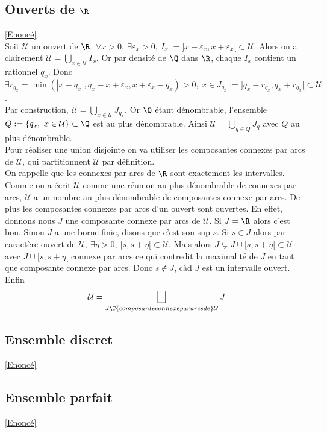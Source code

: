 \documentclass[8pt]{book}
\begin{document}
	\subsection{Ouverts de $\R$ }
	\label{Ouverts de R corrigé}
	\textcolor{blue}{\hyperref[Ouverts de R]{[Enoncé]}}\\
	Soit $\mathcal U$ un ouvert de $\R$. $\forall x>0,\ \exists \varepsilon_x>0,\ I_x:=]x-\varepsilon_x,x+\varepsilon_x[\subset\mathcal U$. Alors on a clairement $\mathcal U=\displaystyle\bigcup_{x\in \mathcal U}I_x$. Or par densité de $\Q$ dans $\R$, chaque $I_x$ contient un rationnel $q_x$. Donc $\exists r_{q_x}=\min(|x-q_x|,q_x-x+\varepsilon_x,x+\varepsilon_x-q_x)>0,\ x\in J_{q_x}:=]q_x-r_{q_x},q_x+r_{q_x}[\subset \mathcal U$.\\
	Par construction, $\mathcal U=\displaystyle\bigcup_{x\in \mathcal U}J_{q_x}$. Or $\Q$ étant dénombrable, l'ensemble $Q:=\{q_x,\ x\in \mathcal U\}\subset\Q$ est au plus dénombrable. Ainsi $\mathcal U=\displaystyle\bigcup_{q\in Q} J_q$ avec $Q$ au plus dénombrable.\\
	Pour réaliser une union disjointe on va utiliser les composantes connexes par arcs de $\mathcal U$, qui partitionnent $\mathcal U$ par définition.\\
	On rappelle que les connexes par arcs de $\R$ sont exactement les intervalles. Comme on a écrit $\mathcal U$ comme une réunion au plus dénombrable de connexes par arcs, $\mathcal U$ a un nombre au plus dénombrable de composantes connexe par arcs. De plus les composantes connexes par arcs d'un ouvert sont ouvertes. En effet, donnons nous $J$ une composante connexe par arcs de $\mathcal U$. Si $J=\R$ alors c'est bon. Sinon $J$ a une borne finie, disons que c'est son sup $s$. Si $s\in J$ alors par caractère ouvert de $\mathcal U,\ \exists \eta>0,\ [s,s+\eta[\subset \mathcal U$. Mais alors $J\subsetneq J\cup[s,s+\eta[\subset \mathcal U$ avec $J\cup[s,s+\eta[$ connexe par arcs ce qui contredit la maximalité de $J$ en tant que composante connexe par arcs. Donc $s\notin J$, càd $J$ est un intervalle ouvert. Enfin
	$$\mathcal U=\bigsqcup_{J\T{ composante connexe par arcs de }\mathcal U}J$$
	
	\subsection{Ensemble discret}
	\textcolor{blue}{\hyperref[Ensemble discret]{[Enoncé]}}\\
	\label{Ensemble discret corrigé}
	
	\subsection{Ensemble parfait}
	\textcolor{blue}{\hyperref[Ensemble parfait]{[Enoncé]}}\\
	\label{Ensemble parfait corrigé}
\end{document}
